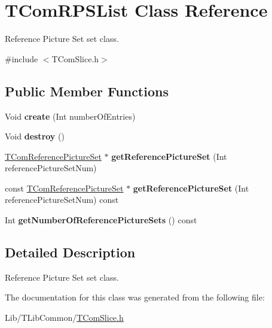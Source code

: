 \hypertarget{class_t_com_r_p_s_list}{}\section{T\+Com\+R\+P\+S\+List Class Reference}
\label{class_t_com_r_p_s_list}


Reference Picture Set set class.  




{\ttfamily \#include $<$T\+Com\+Slice.\+h$>$}

\subsection*{Public Member Functions}
\begin{DoxyCompactItemize}
\item 
\mbox{\label{class_t_com_r_p_s_list_abccade1516c65b772d86b7a2ec951f14}} 
Void {\bfseries create} (Int number\+Of\+Entries)
\item 
\mbox{\label{class_t_com_r_p_s_list_abc65ca6bcdf1a9ae08efbcc584636e86}} 
Void {\bfseries destroy} ()
\item 
\mbox{\label{class_t_com_r_p_s_list_a080f2e41725e6cffc28b9912a6c19ba2}} 
\hyperlink{class_t_com_reference_picture_set}{T\+Com\+Reference\+Picture\+Set} $\ast$ {\bfseries get\+Reference\+Picture\+Set} (Int reference\+Picture\+Set\+Num)
\item 
\mbox{\label{class_t_com_r_p_s_list_a6cb262d34c926a08dc1caf87a8295dad}} 
const \hyperlink{class_t_com_reference_picture_set}{T\+Com\+Reference\+Picture\+Set} $\ast$ {\bfseries get\+Reference\+Picture\+Set} (Int reference\+Picture\+Set\+Num) const
\item 
\mbox{\label{class_t_com_r_p_s_list_a0690dae2a9abbc14ba053f37480097ac}} 
Int {\bfseries get\+Number\+Of\+Reference\+Picture\+Sets} () const
\end{DoxyCompactItemize}


\subsection{Detailed Description}
Reference Picture Set set class. 

The documentation for this class was generated from the following file\+:\begin{DoxyCompactItemize}
\item 
Lib/\+T\+Lib\+Common/\hyperlink{_t_com_slice_8h}{T\+Com\+Slice.\+h}\end{DoxyCompactItemize}
